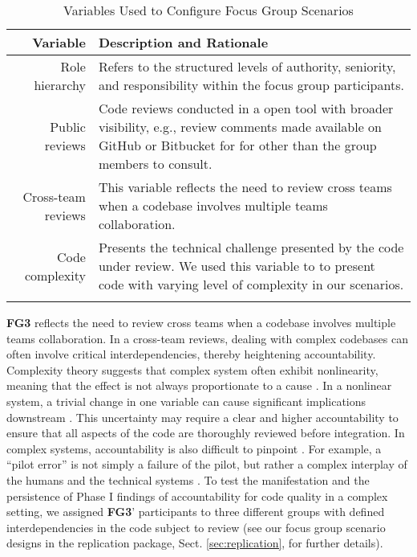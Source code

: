 \begin{table}[t!]

    \caption{Variables Used to Configure Focus Group Scenarios}
    \label{tbl:variables_description}
    \centering
    
    \begin{tabular}{rp{10.5cm}}
    
        \toprule
        \textbf{Variable} & \textbf{Description and Rationale} \\
        
        \midrule
        Role hierarchy & Refers to the structured levels of authority, seniority, and responsibility within the focus group participants.\\

        Public reviews & Code reviews conducted in a open tool with broader visibility, e.g., review comments made available on GitHub or Bitbucket for for other than the group members to consult. \\

        Cross-team reviews & This variable reflects the need to review cross teams when a codebase involves multiple teams collaboration. \\

        Code complexity & Presents the technical challenge presented by the code under review. We used this variable to to present code with varying level of complexity in our scenarios. \\
        
        \bottomrule
        
    \vspace{-0.5cm}
    
    \end{tabular}

\end{table}

\textbf{FG3} reflects the need to review cross teams when a codebase involves multiple teams collaboration. In a cross-team reviews, dealing with complex codebases can often involve critical interdependencies, thereby heightening accountability. Complexity theory suggests that complex system often exhibit nonlinearity, meaning that the effect is not always proportionate to a cause \citep{byrne2002complexity,larsen2013complexity}. In a nonlinear system, a trivial change in one variable can cause significant implications downstream \citep{byrne2002complexity,larsen2013complexity}. This uncertainty may require a clear and higher accountability to ensure that all aspects of the code are thoroughly reviewed before integration. In complex systems, accountability is also difficult to
pinpoint \citep{kacianka2021designing}. For example, a ``pilot error'' is not simply a failure of the pilot, but rather a complex interplay of the humans and the technical systems \citep{kacianka2021designing}. To test the manifestation and the persistence of Phase I findings of accountability for code quality in a complex setting, we assigned \textbf{FG3}' participants to three different groups with defined interdependencies in the code subject to review (see our focus group scenario designs in the replication package, Sect. \ref{sec:replication}, for further details).

